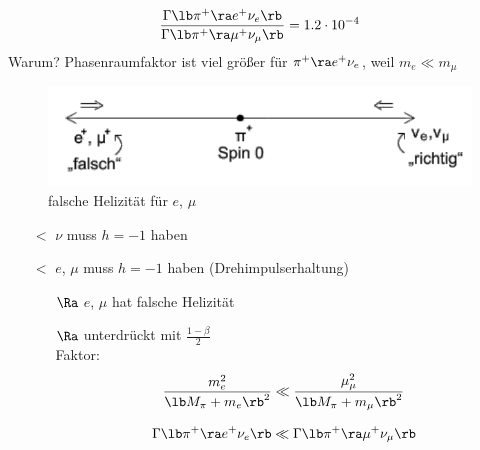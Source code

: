 \begin{itemize}
\begin{align*}
\frac{\Gamma \lb  \pi^+ \ra e^+ \nu_e\rb }{\Gamma \lb  \pi^+ \ra \mu^+ \nu_\mu\rb  }= 1.2\cdot 10^{-4}
\end{align*}
Warum? Phasenraumfaktor ist viel größer für $\pi^+ \ra e^+ \nu_e$, weil $m_e\ll m_\mu$

\begin{figure}[!ht]
\centering
\includegraphics[width=.5\textwidth]{imgs/ep5-fig-8-9.pdf}
\caption{falsche Helizität für $e$, $\mu$ \label{fig:8.9}}
\end{figure}
\newpage

\begin{itemize}
\item[$\lt$] $\nu$ muss $h=-1$ haben
\item[$\lt$] $e$, $\mu$ muss $h=-1$ haben (Drehimpulserhaltung)
\begin{itemize}
\item[$\Ra$] $e$, $\mu$ hat \glqq falsche\grqq{} Helizität
\item[$\Ra$] unterdrückt mit $\frac{1 - \beta}{2}$\\
Faktor:
\begin{align}
\frac{m_e^2}{\lb M_\pi + m_e\rb ^2} \ll \frac{\mu_\mu^2}{\lb M_\pi + m_\mu \rb ^2}
\end{align}

\begin{align*}
\Gamma \lb  \pi^+ \ra e^+ \nu_e\rb  \ll \Gamma \lb  \pi^+ \ra \mu^+ \nu_\mu\rb 
\end{align*}
\end{itemize}
\end{itemize}
\end{itemize}

